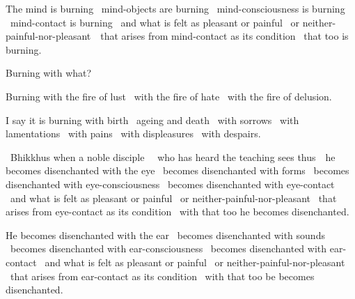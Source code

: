 \begin{english-only-hang}
  The mind is burning \breathmark\ mind-objects are burning \breathmark\ mind-consciousness is burning \breathmark\ mind-contact is burning \breathmark\ and what is felt as pleasant or painful \breathmark\ or neither-painful-nor-{pleasant}~\breathmark\ that arises from mind-contact as its condition \breathmark\ that too is burning.
\end{english-only-hang}

\begin{english-only-hang}
  Burning with what?
\end{english-only-hang}

\begin{english-only-hang}
  Burning with the fire of lust \breathmark\ with the fire of hate \breathmark\ with the fire of delusion.
\end{english-only-hang}

\begin{english-only-hang}
  I say it is burning with birth \breathmark\ ageing and death \breathmark\ with sorrows \breathmark\ with lamentations \breathmark\ with pains \breathmark\ with displeasures \breathmark\ with despairs.
\end{english-only-hang}

\begin{english-only-hang}
  \anglebracketleft\ \hspace{-0.5mm}Bhikkhus when a noble disciple \hspace{-0.5mm}\anglebracketright\ \breathmark\ who has heard the teaching sees \mbox{thus}~\breathmark\ he becomes disenchanted with the eye \breathmark\ becomes disenchanted with forms \breathmark\ becomes disenchanted with eye-consciousness \breathmark\ becomes disenchanted with eye-contact \breathmark\ and what is felt as pleasant or painful \breathmark\ or neither-painful-nor-pleasant \breathmark\ that arises from eye-contact as its condition \breathmark\ with that too he becomes disenchanted.
\end{english-only-hang}

\begin{english-only-hang}
  He becomes disenchanted with the ear \breathmark\ becomes disenchanted with sounds \breathmark\ becomes disenchanted with ear-consciousness \breathmark\ becomes disenchanted with ear-contact \breathmark\ and what is felt as pleasant or painful \breathmark\ or neither-painful-nor-pleasant \breathmark\ that arises from ear-contact as its condition \breathmark\ with that too be becomes disenchanted.
\end{english-only-hang}

